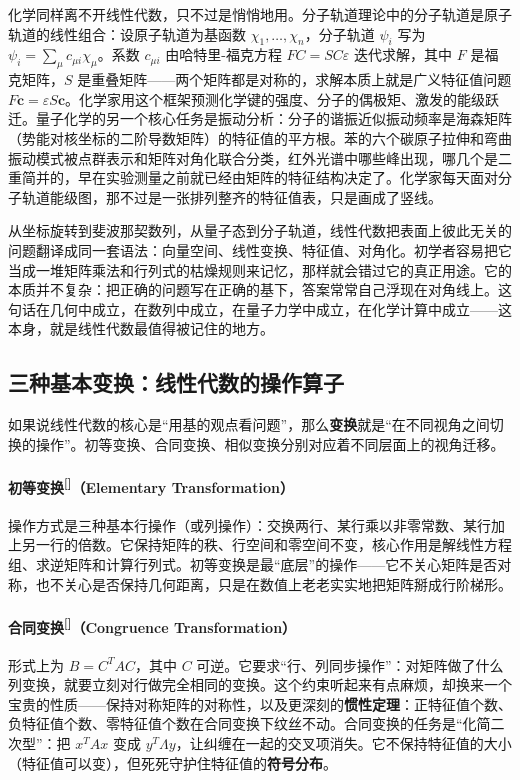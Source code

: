 \documentclass[UTF8]{ctexbook}
\begin{document}
化学同样离不开线性代数，只不过是悄悄地用。分子轨道理论中的分子轨道是原子轨道的线性组合：设原子轨道为基函数 $\chi_1,\dots,\chi_n$，分子轨道 $\psi_i$ 写为 $\psi_i=\sum_{\mu}c_{\mu i}\chi_\mu$。系数 $c_{\mu i}$ 由哈特里-福克方程 $FC=SC\varepsilon$ 迭代求解，其中 $F$ 是福克矩阵，$S$ 是重叠矩阵——两个矩阵都是对称的，求解本质上就是广义特征值问题 $F\mathbf{c}=\varepsilon S\mathbf{c}$。化学家用这个框架预测化学键的强度、分子的偶极矩、激发的能级跃迁。量子化学的另一个核心任务是振动分析：分子的谐振近似振动频率是海森矩阵（势能对核坐标的二阶导数矩阵）的特征值的平方根。苯的六个碳原子拉伸和弯曲振动模式被点群表示和矩阵对角化联合分类，红外光谱中哪些峰出现，哪几个是二重简并的，早在实验测量之前就已经由矩阵的特征结构决定了。化学家每天面对分子轨道能级图，那不过是一张排列整齐的特征值表，只是画成了竖线。

从坐标旋转到斐波那契数列，从量子态到分子轨道，线性代数把表面上彼此无关的问题翻译成同一套语法：向量空间、线性变换、特征值、对角化。初学者容易把它当成一堆矩阵乘法和行列式的枯燥规则来记忆，那样就会错过它的真正用途。它的本质并不复杂：把正确的问题写在正确的基下，答案常常自己浮现在对角线上。这句话在几何中成立，在数列中成立，在量子力学中成立，在化学计算中成立——这本身，就是线性代数最值得被记住的地方。

\subsection*{三种基本变换：线性代数的操作算子}

如果说线性代数的核心是“用基的观点看问题”，那么\textbf{变换}就是“在不同视角之间切换的操作”。初等变换、合同变换、相似变换分别对应着不同层面上的视角迁移。

\paragraph{初等变换\textsuperscript{[\pageref{Elementary_Transformation}]}（Elementary Transformation）}
操作方式是三种基本行操作（或列操作）：交换两行、某行乘以非零常数、某行加上另一行的倍数。它保持矩阵的秩、行空间和零空间不变，核心作用是解线性方程组、求逆矩阵和计算行列式。初等变换是最“底层”的操作——它不关心矩阵是否对称，也不关心是否保持几何距离，只是在数值上老老实实地把矩阵掰成行阶梯形。

\paragraph{合同变换\textsuperscript{[\pageref{Congruence_Transformation}]}（Congruence Transformation）}
形式上为 $B = C^T A C$，其中 $C$ 可逆。它要求“行、列同步操作”：对矩阵做了什么列变换，就要立刻对行做完全相同的变换。这个约束听起来有点麻烦，却换来一个宝贵的性质——保持对称矩阵的对称性，以及更深刻的\textbf{惯性定理}：正特征值个数、负特征值个数、零特征值个数在合同变换下纹丝不动。合同变换的任务是“化简二次型”：把 $x^T A x$ 变成 $y^T \Lambda y$，让纠缠在一起的交叉项消失。它不保持特征值的大小（特征值可以变），但死死守护住特征值的\textbf{符号分布}。
\end{document}
